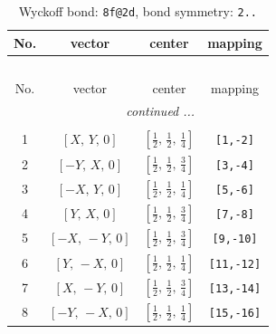 \documentclass[fleqn,8pt]{jsarticle}
\begin{document}
\begin{longtable}{cccc}
\caption{Wyckoff bond: {\tt 8f@2d}, bond symmetry: {\tt 2..}}
 \\
 \hline \hline
No. & vector & center & mapping \\ \hline \endfirsthead

\multicolumn{3}{l}{\tablename\ \thetable{}} \\
 \hline \hline
No. & vector & center & mapping \\ \hline \endhead

 \hline \hline
\multicolumn{3}{r}{\footnotesize\it continued ...} \\ \endfoot

 \hline \hline
\multicolumn{3}{r}{} \\ \endlastfoot

1 & $\left[ X,\, Y,\, 0 \right]$ & $\left[ \frac{1}{2},\, \frac{1}{2},\, \frac{1}{4} \right]$ & {\tt [1,-2]} \\ \hline
2 & $\left[ - Y,\, X,\, 0 \right]$ & $\left[ \frac{1}{2},\, \frac{1}{2},\, \frac{3}{4} \right]$ & {\tt [3,-4]} \\ \hline
3 & $\left[ - X,\, Y,\, 0 \right]$ & $\left[ \frac{1}{2},\, \frac{1}{2},\, \frac{1}{4} \right]$ & {\tt [5,-6]} \\ \hline
4 & $\left[ Y,\, X,\, 0 \right]$ & $\left[ \frac{1}{2},\, \frac{1}{2},\, \frac{3}{4} \right]$ & {\tt [7,-8]} \\ \hline
5 & $\left[ - X,\, - Y,\, 0 \right]$ & $\left[ \frac{1}{2},\, \frac{1}{2},\, \frac{3}{4} \right]$ & {\tt [9,-10]} \\ \hline
6 & $\left[ Y,\, - X,\, 0 \right]$ & $\left[ \frac{1}{2},\, \frac{1}{2},\, \frac{1}{4} \right]$ & {\tt [11,-12]} \\ \hline
7 & $\left[ X,\, - Y,\, 0 \right]$ & $\left[ \frac{1}{2},\, \frac{1}{2},\, \frac{3}{4} \right]$ & {\tt [13,-14]} \\ \hline
8 & $\left[ - Y,\, - X,\, 0 \right]$ & $\left[ \frac{1}{2},\, \frac{1}{2},\, \frac{1}{4} \right]$ & {\tt [15,-16]} \\
\end{longtable}
\renewcommand{\arraystretch}{1.2}
\end{document}
